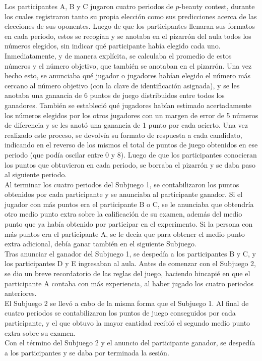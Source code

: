 Los participantes A, B y C jugaron cuatro periodos de $p$-beauty contest, durante los cuales registraron tanto su propia elección como sus predicciones acerca de las elecciones de sus oponentes. Luego de que los participantes llenaran sus formatos en cada periodo, estos se recogían y se anotaba en el pizarrón del aula todos los números elegidos, sin indicar qué participante había elegido cada uno. Inmediatamente, y de manera explícita, se calculaba el promedio de estos números y el número objetivo, que también se anotaban en el pizarrón. Una vez hecho esto, se anunciaba qué jugador o jugadores habían elegido el número más cercano al número objetivo (con la clave de identificación asignada), y se les anotaba una ganancia de 6 puntos de juego distribuidos entre todos los ganadores. También se estableció qué jugadores habían estimado acertadamente los números elegidos por los otros jugadores con un margen de error de 5 números de diferencia y se les anotó una ganancia de 1 punto por cada acierto. Una vez realizado este proceso, se devolvía su formato de respuesta a cada candidato, indicando en el reverso de los mismos el total de puntos de juego obtenidos en ese periodo (que podía oscilar entre 0 y 8). Luego de que los participantes conocieran los puntos que obtuvieron en cada periodo, se borraba el pizarrón y se daba paso al siguiente periodo.\\

Al terminar los cuatro periodos del Subjuego 1, se contabilizaron los puntos obtenidos por cada participante y se anunciaba al participante ganador. Si el jugador con más puntos era el participante B o C, se le anunciaba que obtendría otro medio punto extra sobre la calificación de su examen, además del medio punto que ya había obtenido por participar en el experimento. Si la persona con más puntos era el participante A, se le decía que para obtener el medio punto extra adicional, debía ganar también en el siguiente Subjuego.\\

Tras anunciar el ganador del Subjuego 1, se despedía a los participantes B y C, y los participantes D y E ingresaban al aula. Antes de comenzar con el Subjuego 2, se dio un breve recordatorio de las reglas del juego, haciendo hincapié en que el participante A contaba con más experiencia, al haber jugado los cuatro periodos anteriores.\\

El Subjuego 2 se llevó a cabo de la misma forma que el Subjuego 1. Al final de cuatro periodos se contabilizaron los puntos de juego conseguidos por cada participante, y el que obtuvo la mayor cantidad recibió el segundo medio punto extra sobre su examen.\\

Con el término del Subjuego 2 y el anuncio del participante ganador, se despedía a los participantes y se daba por terminada la sesión.\\

